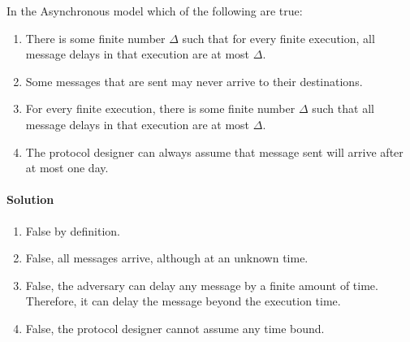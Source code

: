 \begin{xca}
    In the Asynchronous model which of the following are true:
    \begin{enumerate}
        \item There is some finite number $\Delta$ such that for every finite execution, all
         message delays in that execution are at most $\Delta$.
        \item Some messages that are sent may never arrive to their destinations.
        \item For every finite execution, there is some finite number $\Delta$ such that 
        all message delays in that execution are at most $\Delta$.
        \item The protocol designer can always assume that message sent will arrive after at most one day.
    \end{enumerate}
    \paragraph{Solution}
    \begin{enumerate}
        \item False by definition.
        \item False, all messages arrive, although at an unknown time.
        \item {} False, the adversary can delay any message by a finite 
        amount of time. Therefore, it can delay the message beyond the execution time.
        \item False, the protocol designer cannot assume any time bound.
    \end{enumerate}
\end{xca}


